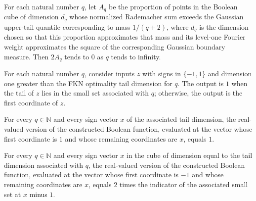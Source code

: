 \begin{theorem}
\label{FABL.tendsto_fknOptimalityDelta}
\leanok
{}
For each natural number $q$, let $A_q$ be the proportion of points in the Boolean cube
of dimension $d_q$ whose normalized Rademacher sum exceeds the Gaussian upper-tail
quantile corresponding to mass $1/(q+2)$, where $d_q$ is the dimension chosen so that
this proportion approximates that mass and its level-one Fourier weight approximates the
square of the corresponding Gaussian boundary measure. Then $2A_q$ tends to $0$ as $q$
tends to infinity.
\end{theorem}

\begin{definition}
\label{FABL.fknOptimalityFunction}
\leanok
{}
For each natural number $q$, consider inputs $z$ with signs in $\{−1,1\}$ and
dimension one greater than the FKN optimality tail dimension for $q$. The output is $1$
when the tail of $z$ lies in the small set associated with $q$; otherwise, the output is
the first coordinate of $z$.
\end{definition}

\begin{theorem}
\label{FABL.fknOptimalityFunction_toReal_cons_one}
\leanok
{}
For every $q\in\mathbb{N}$ and every sign vector $x$ of the associated tail dimension,
the real-valued version of the constructed Boolean function, evaluated at the vector
whose first coordinate is $1$ and whose remaining coordinates are $x$, equals $1$.
\end{theorem}

\begin{theorem}
\label{FABL.fknOptimalityFunction_toReal_cons_neg_one}
\leanok
{}
For every $q\in\mathbb{N}$ and every sign vector $x$ in the cube of dimension equal to
the tail dimension associated with $q$, the real-valued version of the constructed
Boolean function, evaluated at the vector whose first coordinate is $-1$ and whose
remaining coordinates are $x$, equals $2$ times the indicator of the associated small
set at $x$ minus $1$.
\end{theorem}


